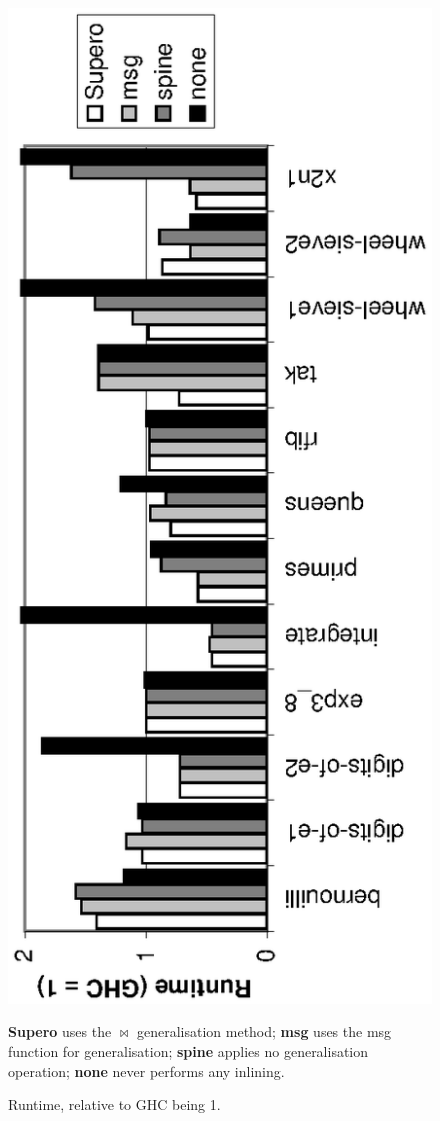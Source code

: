 \begin{figure}
\begin{center}
\includegraphics[scale=0.75,angle=270]{graphics/supero-nofib.eps}
\end{center}
\vspace{-4mm}

\textbf{Supero} uses the $\bowtie$ generalisation method; \textbf{msg} uses the msg function for generalisation; \textbf{spine} applies no generalisation operation; \textbf{none} never performs any inlining.

\vspace{2mm}
\caption{Runtime, relative to GHC being 1.}
\label{fig:haskell_results}
\end{figure}


